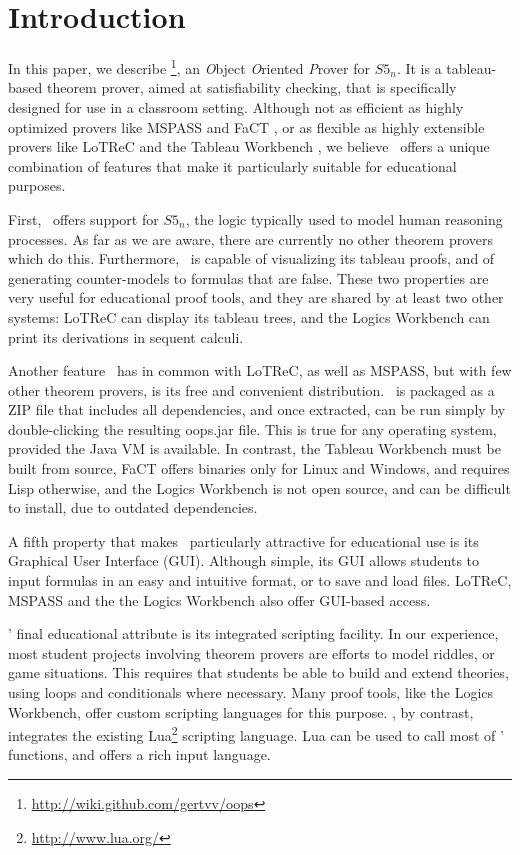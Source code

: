 \section{Introduction}
\label{sec:introduction}

In this paper, we describe \oops\footnote{\url{http://wiki.github.com/gertvv/oops}},
an {\it O}bject {\it O}riented {\it P}rover for $S5_n$.
It is a tableau-based theorem prover, aimed at satisfiability checking, that is specifically designed for use in a
classroom setting.
Although not as efficient as highly optimized provers like MSPASS
\citep{mspass2000} and FaCT \citep{fact1998}, or as flexible as highly
extensible provers like LoTReC \citep{lotrec2005} and the Tableau Workbench
\citep{twb2009}, we believe \oops\ offers a unique combination of features
that make it particularly suitable for educational purposes.

First, \oops\ offers support for $S5_n$, the logic typically used to model
human reasoning processes.
As far as we are aware, there are currently no other theorem provers which do
this.
Furthermore, \oops\ is capable of visualizing its tableau proofs, and of
generating counter-models to formulas that are false.
These two properties are very useful for educational proof tools, and they are
shared by at least two other systems: LoTReC can display its tableau trees,
and the Logics Workbench \citep{heuerding1996} can print its derivations in
sequent calculi.

Another feature \oops\ has in common with LoTReC, as well as MSPASS, but with
few other theorem provers, is its free and convenient distribution.
\oops\ is packaged as a ZIP file that includes all dependencies, and once
extracted, can be run simply by double-clicking the resulting oops.jar file.
This is true for any operating system, provided the Java VM is available.
In contrast, the Tableau Workbench must be built from source,
FaCT offers binaries only for Linux and Windows, and requires
Lisp otherwise, and the Logics Workbench is not open source, and can be difficult to install, due to outdated dependencies.

A fifth property that makes \oops\ particularly attractive for educational use
is its Graphical User Interface (GUI).
Although simple, its GUI allows students to input formulas in an easy and
intuitive format, or to save and load files.  LoTReC, MSPASS and the the Logics Workbench also offer GUI-based access.

\oops' final educational attribute is its integrated scripting facility.
In our experience, most student projects involving theorem provers are efforts
to model riddles, or game situations.
This requires that students be able to build and extend theories, using loops
and conditionals where necessary.
Many proof tools, like the Logics Workbench, offer custom scripting languages
for this purpose.
\oops, by contrast, integrates the existing Lua\footnote{\url{http://www.lua.org/}}
scripting language.
Lua can be used to call most of \oops' functions, and offers a rich input
language.

